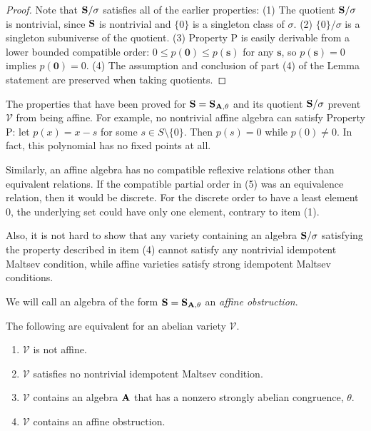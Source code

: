\begin{proof}
Note that ${{\mathbf{\uppercase{s}}}}/\sigma$ satisfies all of the earlier properties:
(1)
The quotient ${{\mathbf{\uppercase{s}}}}/\sigma$ is nontrivial, since
${{\mathbf{\uppercase{s}}}}$ is nontrivial and $\{0\}$ is a singleton class
of $\sigma$. (2)
$\{0\}/\sigma$ is a singleton subuniverse of the quotient.
(3) Property P is easily derivable from a
lower bounded compatible order:
$0\leq p({{\mathbf{{0}}}})\leq p({{\mathbf{{s}}}})$ for any ${{\mathbf{{s}}}}$,
so $p({{\mathbf{{s}}}})=0$ implies $p({{\mathbf{{0}}}})=0$.
(4) The assumption and conclusion of part (4) of the
Lemma statement are preserved when taking quotients.
\end{proof}

The properties that have been proved for ${{\mathbf{\uppercase{s}}}} = {{\mathbf{\uppercase{s}}}}_{{{\mathbf{\uppercase{a}}}},\theta}$
and its quotient ${{\mathbf{\uppercase{s}}}}/\sigma$
prevent $\mathcal V$ from being affine. For example, no nontrivial
affine algebra can satisfy Property P:
let $p(x) = x-s$ for some $s\in S\setminus\{0\}$.
Then $p(s)=0$ while $p(0)\neq 0$. In fact,
this polynomial has no fixed points at all.

Similarly, an affine algebra has no compatible reflexive relations
other than equivalent relations. If the compatible partial order
in (5) was an equivalence relation, then it would be discrete.
For the discrete order to have a least element $0$, the
underlying set could have only one element, contrary to item (1).

Also, it is not hard to show that any variety 
containing an algebra ${{\mathbf{\uppercase{s}}}}/\sigma$ satisfying
the property described in item (4) cannot satisfy 
any nontrivial idempotent Maltsev condition, while
affine varieties satisfy strong idempotent Maltsev conditions.

We will call an algebra of the form ${{\mathbf{\uppercase{s}}}} = {{\mathbf{\uppercase{s}}}}_{{{\mathbf{\uppercase{a}}}},\theta}$
an \emph{affine obstruction}.

\begin{thm}\label{affine}
  The following are equivalent for an abelian variety
  $\mathcal V$.
  \begin{enumerate}
  \item $\mathcal V$ is not affine.
  \item $\mathcal V$ satisfies no nontrivial idempotent Maltsev condition.
  \item $\mathcal V$ contains an algebra ${{\mathbf{\uppercase{a}}}}$ that has a nonzero
    strongly abelian congruence, $\theta$.
  \item $\mathcal V$ contains an affine obstruction.
    \end{enumerate}
  \end{thm}

